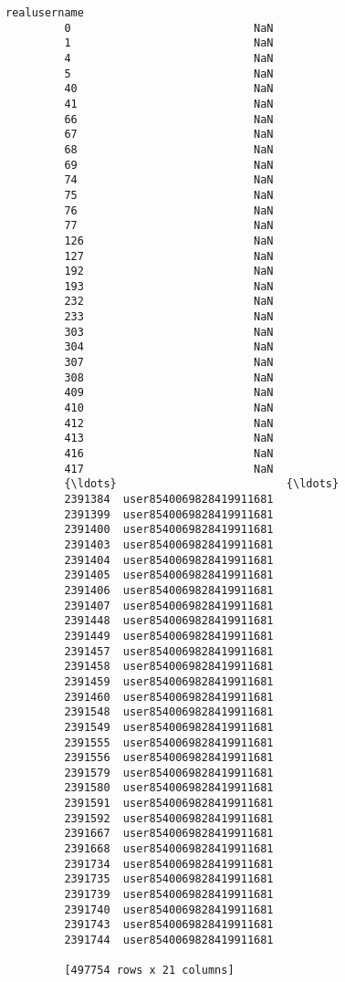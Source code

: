 \documentclass[11pt]{article}
\begin{document}
\begin{Verbatim}[commandchars=\\\{\}]
                             realusername  
         0                            NaN  
         1                            NaN  
         4                            NaN  
         5                            NaN  
         40                           NaN  
         41                           NaN  
         66                           NaN  
         67                           NaN  
         68                           NaN  
         69                           NaN  
         74                           NaN  
         75                           NaN  
         76                           NaN  
         77                           NaN  
         126                          NaN  
         127                          NaN  
         192                          NaN  
         193                          NaN  
         232                          NaN  
         233                          NaN  
         303                          NaN  
         304                          NaN  
         307                          NaN  
         308                          NaN  
         409                          NaN  
         410                          NaN  
         412                          NaN  
         413                          NaN  
         416                          NaN  
         417                          NaN  
         {\ldots}                          {\ldots}  
         2391384  user8540069828419911681  
         2391399  user8540069828419911681  
         2391400  user8540069828419911681  
         2391403  user8540069828419911681  
         2391404  user8540069828419911681  
         2391405  user8540069828419911681  
         2391406  user8540069828419911681  
         2391407  user8540069828419911681  
         2391448  user8540069828419911681  
         2391449  user8540069828419911681  
         2391457  user8540069828419911681  
         2391458  user8540069828419911681  
         2391459  user8540069828419911681  
         2391460  user8540069828419911681  
         2391548  user8540069828419911681  
         2391549  user8540069828419911681  
         2391555  user8540069828419911681  
         2391556  user8540069828419911681  
         2391579  user8540069828419911681  
         2391580  user8540069828419911681  
         2391591  user8540069828419911681  
         2391592  user8540069828419911681  
         2391667  user8540069828419911681  
         2391668  user8540069828419911681  
         2391734  user8540069828419911681  
         2391735  user8540069828419911681  
         2391739  user8540069828419911681  
         2391740  user8540069828419911681  
         2391743  user8540069828419911681  
         2391744  user8540069828419911681  
         
         [497754 rows x 21 columns]
\end{Verbatim}
            

    
    
    
    
\end{document}
